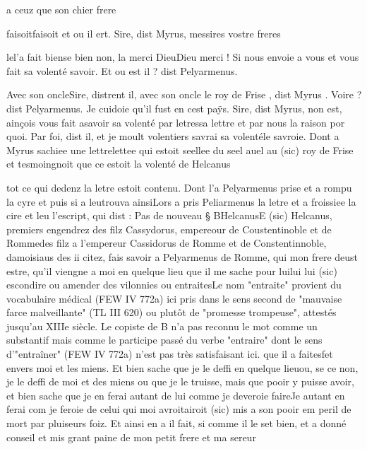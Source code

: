 \documentclass{article}
\begin{document}
\begin{pages}
                  a ceuz que son chier frere
               
                  faisoitfaisoit et ou il ert. Sire, dist Myrus, messires vostre freres
                  
                     
                           lel'a fait biense bien non, 
                     la merci DieuDieu merci ! Si nous envoie a vous et vous fait sa volenté savoir.
               Et ou est il ? dist Pelyarmenus.
               
                     Avec son oncleSire, distrent il, avec son oncle
                  le roy de Frise
                     , dist Myrus .
               Voire ? dist Pelyarmenus. Je cuidoie qu’il fust en cest paÿs.
               Sire, dist Myrus,
                  non est, ainçois vous fait asavoir sa volenté par 
                     letressa lettre et par nous la raison por quoi.
               Par foi, dist il, et je 
                     moult volentiers 
                     savrai sa volentéle savroie. Dont a Myrus sachiee une 
                  lettrelettee qui estoit seellee du seel 
                  auel au (sic)
               roy de Frise
               et tesmoingnoit que ce estoit la volenté 
                  de
               Helcanus
               
                  tot ce qui dedenz la letre estoit contenu. 
                  Dont l’a Pelyarmenus prise et a rompu la cyre et puis 
                        si a leutrouva ainsiLors a pris Peliarmenus la letre et a froissiee la cire et leu  l’escript, qui dist : \pend
            \pstart Pas de nouveau § BHelcanusE (sic) Helcanus, premiers engendrez 
                     des filz Cassydorus, empereour de Coustentinoble et de Rommedes filz a l'empereur Cassidorus de Romme et de
                        Constentinnoble, damoisiaus des ii citez, fais savoir a Pelyarmenus de Romme, qui mon frere deust estre, qu’il viengne a moi
                  en quelque lieu que il me sache pour 
                     luilui lui (sic) escondire ou amender des vilonnies 
                     ou entraitesLe nom "entraite" provient du
                     vocabulaire médical (FEW IV 772a) ici pris dans le sens second de "mauvaise
                     farce malveillante" (TL III 620) ou plutôt de "promesse trompeuse", attestés
                     jusqu'au XIIIe siècle. Le copiste de B n'a pas reconnu le mot comme un
                     substantif mais comme le participe passé du verbe "entraire" dont le sens
                     d'"entraîner" (FEW IV 772a) n'est pas très satisfaisant ici.  que il a 
                     faitesfet envers moi et les miens. 
                     Et bien sache que je le deffi en quelque lieuou, se ce non, je le deffi de moi et des miens ou que je le truisse, mais que pooir y puisse avoir,
                      et bien sache que je en ferai autant de lui comme je
                        deveroie faireJe autant en ferai com je feroie de celui qui moi 
                     avroitairoit (sic) mis a son pooir em peril de mort 
                     par pluiseurs foiz. Et ainsi en a il fait, si comme il le
                        set bien, et a donné conseil et mis grant paine de mon petit frere et ma sereur
                  

\end{pages}
\end{document}
